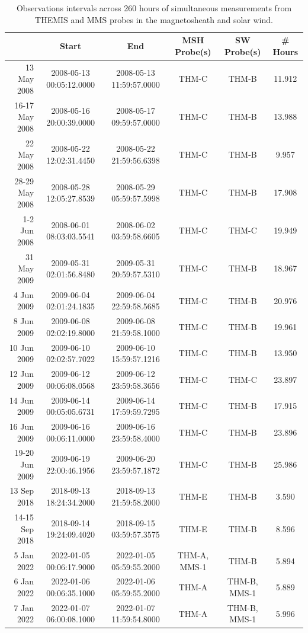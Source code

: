 \begin{longtable}{r|ccccc}
\caption{Observations intervals across 260 hours of simultaneous measurements from THEMIS and MMS probes in the magnetosheath and solar wind.} \\
\hline
{}             &                     Start &                       End &  MSH Probe(s) & SW Probe(s)  & \# Hours \\
\hline
13 May 2008 	& 2008-05-13 00:05:12.0000	& 2008-05-13 11:59:57.0000	& THM-C 	   & THM-B 		  & 11.912 \\
16-17 May 2008 	& 2008-05-16 20:00:39.0000	& 2008-05-17 09:59:57.0000	& THM-C 	   & THM-B 		  & 13.988 \\
22 May 2008 	& 2008-05-22 12:02:31.4450 	& 2008-05-22 21:59:56.6398 	& THM-C 	   & THM-B 		  &  9.957 \\
28-29 May 2008 	& 2008-05-28 12:05:27.8539 	& 2008-05-29 05:59:57.5998 	& THM-C 	   & THM-B 		  & 17.908 \\
1-2 Jun 2008 	& 2008-06-01 08:03:03.5541 	& 2008-06-02 03:59:58.6605 	& THM-C	       & THM-C 		  & 19.949 \\
31 May 2009 	& 2009-05-31 02:01:56.8480 	& 2009-05-31 20:59:57.5310 	& THM-C	       & THM-B 		  & 18.967 \\
4 Jun 2009 	   	& 2009-06-04 02:01:24.1835	& 2009-06-04 22:59:58.5685 	& THM-C 	   & THM-B 		  & 20.976 \\
8 Jun 2009 	   	& 2009-06-08 02:02:19.8000	& 2009-06-08 21:59:58.1000	& THM-C 	   & THM-B 		  & 19.961 \\
10 Jun 2009    	& 2009-06-10 02:02:57.7022 	& 2009-06-10 15:59:57.1216 	& THM-C        & THM-B 		  & 13.950 \\
12 Jun 2009    	& 2009-06-12 00:06:08.0568 	& 2009-06-12 23:59:58.3656 	& THM-C 	   & THM-C 		  & 23.897 \\
14 Jun 2009    	& 2009-06-14 00:05:05.6731 	& 2009-06-14 17:59:59.7295 	& THM-C        & THM-B 		  & 17.915 \\
16 Jun 2009    	& 2009-06-16 00:06:11.0000	& 2009-06-16 23:59:58.4000	& THM-C 	   & THM-B 		  & 23.896 \\
19-20 Jun 2009 	& 2009-06-19 22:00:46.1956 	& 2009-06-20 23:59:57.1872 	& THM-C 	   & THM-B 		  & 25.986 \\
13 Sep 2018    	& 2018-09-13 18:24:34.2000	& 2018-09-13 21:59:58.2000	& THM-E 	   & THM-B 		  &  3.590 \\
14-15 Sep 2018 	& 2018-09-14 19:24:09.4020 	& 2018-09-15 03:59:57.3575 	& THM-E 	   & THM-B 		  &  8.596 \\
5 Jan 2022 	   	& 2022-01-05 00:06:17.9000	& 2022-01-05 05:59:55.2000	& THM-A, MMS-1 & THM-B 		  &  5.894 \\
6 Jan 2022 	   	& 2022-01-06 00:06:35.1000	& 2022-01-06 05:59:55.2000	& THM-A 	   & THM-B, MMS-1 &  5.889 \\
7 Jan 2022 	   	& 2022-01-07 06:00:08.1000	& 2022-01-07 11:59:54.8000	& THM-A 	   & THM-B, MMS-1 &  5.996 \\
\hline
\end{longtable}